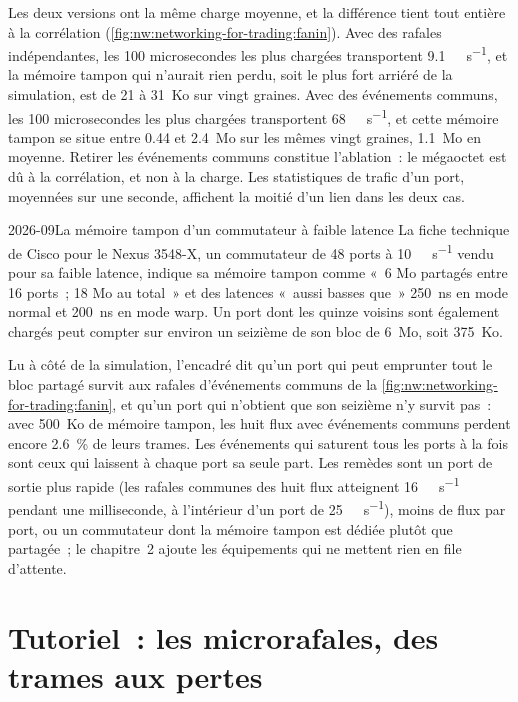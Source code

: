 Les deux versions ont la même charge moyenne, et la différence tient tout entière à la corrélation
(\cref{fig:nw:networking-for-trading:fanin}). Avec des rafales indépendantes, les 100 microsecondes les plus chargées transportent
\qty{9.1}{\giga\bit\per\second}, et la mémoire tampon qui n'aurait rien perdu, soit le plus fort arriéré de la simulation, est de 21 à 31~Ko
sur vingt graines. Avec des événements communs, les 100 microsecondes les plus chargées transportent \qty{68}{\giga\bit\per\second}, et cette mémoire tampon
se situe entre 0.44 et 2.4~Mo sur les mêmes vingt graines, 1.1~Mo en moyenne. Retirer les événements communs constitue l'ablation~: le
mégaoctet est dû à la corrélation, et non à la charge. Les statistiques de trafic d'un port, moyennées sur une seconde, affichent la moitié d'un lien dans
les deux cas.

\begin{dated}{2026-09}{La mémoire tampon d'un commutateur à faible latence}\label{dat:nw:networking-for-trading:buffer}
La fiche technique de Cisco pour le Nexus 3548-X, un commutateur de 48 ports à \qty{10}{\giga\bit\per\second} vendu pour sa faible latence, indique sa
mémoire tampon comme «~6 Mo partagés entre 16 ports~; 18 Mo au total~» et des latences «~aussi basses que~» \qty{250}{\nano\second} en mode normal et
\qty{200}{\nano\second} en mode warp. Un port dont les quinze voisins sont également chargés peut compter sur environ un seizième de son bloc de
6~Mo, soit 375~Ko.
\end{dated}

Lu à côté de la simulation, l'encadré dit qu'un port qui peut emprunter tout le bloc partagé survit aux rafales d'événements communs
de la \cref{fig:nw:networking-for-trading:fanin}, et qu'un port qui n'obtient que son seizième n'y survit pas~: avec 500~Ko de mémoire tampon, les
huit flux avec événements communs perdent encore 2.6~\% de leurs trames. Les événements qui saturent tous les ports à la fois sont ceux qui
laissent à chaque port sa seule part. Les remèdes sont un port de sortie plus rapide (les rafales communes des huit flux atteignent
\qty{16}{\giga\bit\per\second} pendant une milliseconde, à l'intérieur d'un port de \qty{25}{\giga\bit\per\second}), moins de flux par port, ou un commutateur dont la
mémoire tampon est dédiée plutôt que partagée~; le chapitre~2 ajoute les équipements qui ne mettent rien en file d'attente.

\section{Tutoriel~: les microrafales, des trames aux pertes}\label{tut:nw:networking-for-trading:tut}

